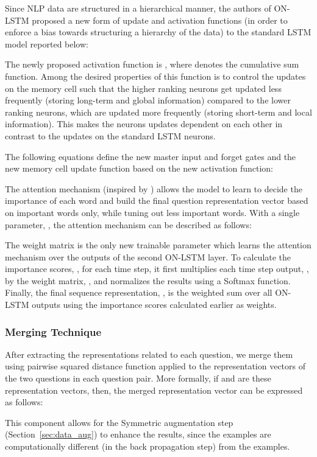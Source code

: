 \documentclass[11pt,a4paper]{article}
\begin{document}
Since NLP data are structured in a hierarchical manner, the authors of ON-LSTM \cite{shen2018ordered} proposed a new form of update and activation functions (in order to enforce a bias towards structuring a hierarchy of the data) to the standard LSTM model reported below:


The newly proposed activation function is , where  denotes the cumulative sum function. Among the desired properties of this function is to control the updates on the memory cell such that the higher ranking neurons get updated less frequently (storing long-term and global information) compared to the lower ranking neurons, which are updated more frequently (storing short-term and local information). This makes the neurons updates dependent on each other in contrast to the updates on the standard LSTM neurons.

The following equations define the new master input and forget gates and the new memory cell update function based on the new activation function:


The attention mechanism (inspired by \cite{bahdanau2014neural,yang2016hierarchical}) allows the model to learn to decide the importance of each word and build the final question representation vector based on important words only, while tuning out less important words. With a single parameter, , the attention mechanism can be described as follows:

The weight matrix  is the only new trainable parameter which learns the attention mechanism over the outputs of the second ON-LSTM layer. To calculate the importance scores, , for each time step, it first multiplies each time step output, , by the weight matrix, , and normalizes the results using a Softmax function. Finally, the final sequence representation, , is the weighted sum over all ON-LSTM outputs using the importance scores calculated earlier as weights.

\subsubsection{Merging Technique}

After extracting the representations related to each question, we merge them using pairwise squared distance function applied to the representation vectors of the two questions in each question pair. More formally, if  and  are these representation vectors, then, the merged representation vector  can be expressed as follows:


This component allows for the Symmetric augmentation step (Section~\ref{sec:data_aug}) to enhance the results, since the  examples are computationally different (in the back propagation step) from the  examples.
\end{document}
